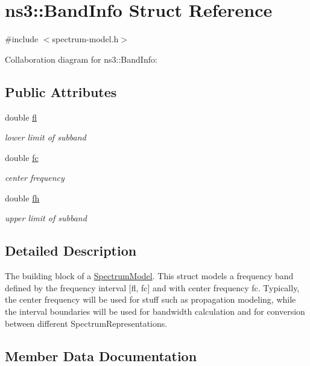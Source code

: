 \hypertarget{structns3_1_1BandInfo}{}\section{ns3\+:\+:Band\+Info Struct Reference}
\label{structns3_1_1BandInfo}


{\ttfamily \#include $<$spectrum-\/model.\+h$>$}



Collaboration diagram for ns3\+:\+:Band\+Info\+:
\subsection*{Public Attributes}
\begin{DoxyCompactItemize}
\item 
double \hyperlink{structns3_1_1BandInfo_a5e9018ae65c7625cc6d5c3c0067a9104}{fl}
\begin{DoxyCompactList}\small\item\em lower limit of subband \end{DoxyCompactList}\item 
double \hyperlink{structns3_1_1BandInfo_a02fad8a855735ff477f736bb8cb7bc25}{fc}
\begin{DoxyCompactList}\small\item\em center frequency \end{DoxyCompactList}\item 
double \hyperlink{structns3_1_1BandInfo_a78e8fadd8cafcc28d74bda6010e3d6f4}{fh}
\begin{DoxyCompactList}\small\item\em upper limit of subband \end{DoxyCompactList}\end{DoxyCompactItemize}


\subsection{Detailed Description}
The building block of a \hyperlink{classns3_1_1SpectrumModel}{Spectrum\+Model}. This struct models a frequency band defined by the frequency interval \mbox{[}fl, fc\mbox{]} and with center frequency fc. Typically, the center frequency will be used for stuff such as propagation modeling, while the interval boundaries will be used for bandwidth calculation and for conversion between different Spectrum\+Representations. 

\subsection{Member Data Documentation}

